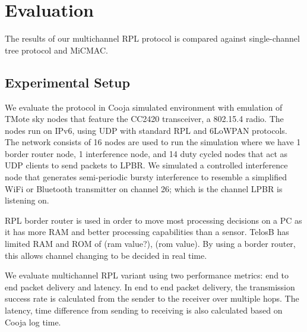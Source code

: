 \section{Evaluation}
The results of our multichannel RPL protocol is compared against single-channel tree protocol and MiCMAC.

\subsection{Experimental Setup}
We evaluate the protocol in Cooja simulated environment with emulation of TMote sky nodes that feature the CC2420 transceiver, a 802.15.4 radio. The nodes run on IPv6, using UDP with standard RPL and 6LoWPAN protocols. The network consists of 16 nodes are used to run the simulation where we have 1 border router node, 1 interference node, and 14 duty cycled nodes that act as UDP clients to send packets to LPBR. We simulated a controlled interference node that generates semi-periodic bursty interference to resemble a simplified WiFi or Bluetooth transmitter on channel 26; which is the channel LPBR is listening on. 

RPL border router is used in order to move most processing decisions on a PC as it has more RAM and better processing capabilities than a sensor. TelosB has limited RAM and ROM of (ram value?), (rom value). By using a border router, this allows channel changing to be decided in real time. 





We evaluate multichannel RPL variant using two performance metrics: end to end packet delivery and latency. In end to end packet delivery, the transmission success rate is calculated from the sender to the receiver over multiple hops. The latency, time difference from sending to receiving is also calculated based on Cooja log time. %

